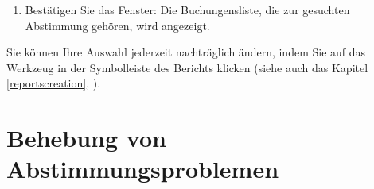 \begin{enumerate}
\begin{itemize}
\begin{itemize}
\begin{itemize}
				\item {}
				\item {};
			\end{itemize}
		\end{itemize}	
	\end{itemize}
	\item Bestätigen Sie das Fenster: Die Buchungensliste, die zur gesuchten Abstimmung gehören, wird angezeigt.
\end{enumerate}

Sie können Ihre Auswahl jederzeit nachträglich ändern, indem Sie auf das Werkzeug  in der Symbolleiste des Berichts klicken (siehe auch das Kapitel \vref{reportscreation}, ).


\section{Behebung von Abstimmungsproblemen\label{reconciliation-solve}}

